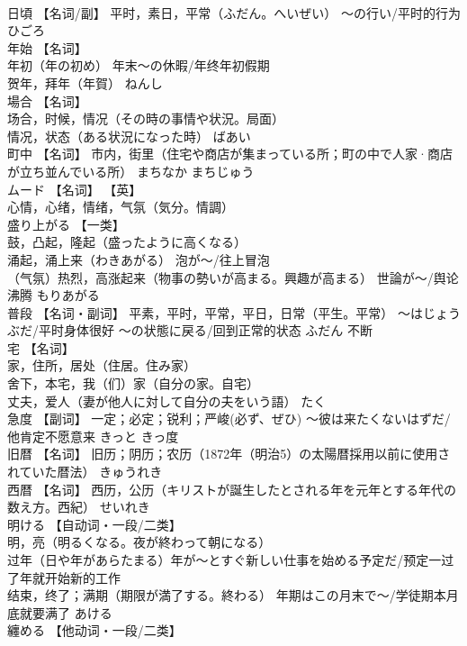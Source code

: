 \documentclass[8pt]{extreport}
\begin{document}
\begin{CJK}{UTF8}{min}
\\	日頃	【名词/副】 平时，素日，平常（ふだん。へいぜい） 〜の行い/平时的行为	ひごろ	
\\	年始	【名词】 
\\	年初（年の初め） 年末～の休暇/年终年初假期 
\\	贺年，拜年（年賀）	ねんし	
\\	場合	【名词】 
\\	场合，时候，情况（その時の事情や状況。局面） 
\\	情况，状态（ある状況になった時）	ばあい	
\\	町中	【名词】 市内，街里（住宅や商店が集まっている所；町の中で人家·商店が立ち並んでいる所）	まちなか まちじゅう	
\\	ムード	【名词】 【英】
\\	心情，心绪，情绪，气氛（気分。情調）		
\\	盛り上がる	【一类】 
\\	鼓，凸起，隆起（盛ったように高くなる） 
\\	涌起，涌上来（わきあがる） 泡が〜/往上冒泡 
\\	（气氛）热烈，高涨起来（物事の勢いが高まる。興趣が高まる） 世論が〜/舆论沸腾	もりあがる	
\\	普段	【名词・副词】 平素，平时，平常，平日，日常（平生。平常） 〜はじょうぶだ/平时身体很好 〜の状態に戻る/回到正常的状态	ふだん	不断
\\	宅	【名词】 
\\	家，住所，居处（住居。住み家） 
\\	舍下，本宅，我（们）家（自分の家。自宅） 
\\	丈夫，爱人（妻が他人に対して自分の夫をいう語）	たく	
\\	急度	【副词】 一定；必定；锐利；严峻(必ず、ぜひ) 〜彼は来たくないはずだ/他肯定不愿意来	きっと	きっ度
\\	旧暦	【名词】 旧历；阴历；农历（1872年（明治5）の太陽暦採用以前に使用されていた暦法）	きゅうれき	
\\	西暦	【名词】 西历，公历（キリストが誕生したとされる年を元年とする年代の数え方。西紀）	せいれき	
\\	明ける	【自动词・一段/二类】 
\\	明，亮（明るくなる。夜が終わって朝になる） 
\\	过年（日や年があらたまる）年が〜とすぐ新しい仕事を始める予定だ/预定一过了年就开始新的工作 
\\	结束，终了；满期（期限が満了する。終わる） 年期はこの月末で〜/学徒期本月底就要满了	あける	
\\	纏める	【他动词・一段/二类】 

\end{CJK}
\end{document}

